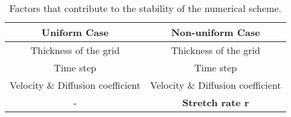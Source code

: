 \begin{table}[h!]
	\begin{center}
		\begin{tabular}{ |c|c|}
			\hline
			\textbf{Uniform Case} & \textbf{Non-uniform Case} \\
			\hline 
			Thickness of the grid	& Thickness of the grid \\
			\hline	
			Time step				& Time step				\\
			\hline
			Velocity \& Diffusion coefficient & Velocity \& Diffusion coefficient \\
			\hline
			-						& \textbf{Stretch rate r} \\
			\hline
		\end{tabular}
		\caption{Factors that contribute to the stability of the numerical scheme.}
	\end{center}
\end{table}
